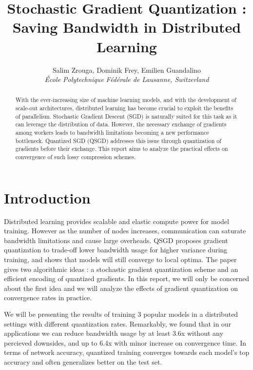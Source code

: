\documentclass[10pt,conference,compsocconf]{IEEEtran}
\begin{document}
\title{Stochastic Gradient Quantization : \\ Saving Bandwidth in Distributed Learning}

\author{
  Salim Zrouga, Dominik Frey, Emilien Guandalino\\
  \textit{École Polytechnique Fédérale de Lausanne, Switzerland}
}

\maketitle

\begin{abstract}

	With the ever-increasing size of machine learning models, and with the development of scale-out architectures, distributed learning has become crucial to exploit the benefits of parallelism. Stochastic Gradient Descent (SGD) is naturally suited for this task as it can leverage the distribution of data. However, the necessary exchange of gradients among workers leads to bandwidth limitations becoming a new performance bottleneck. Quantized SGD (QSGD) addresses this issue through quantization of gradients before their exchange. This report aims to analyze the practical effects on convergence of such lossy compression schemes.
\end{abstract}

\section{Introduction}

Distributed learning provides scalable and elastic compute power for model training. 
However as the number of nodes increases, communication can saturate bandwidth limitations and cause large overheads.
QSGD \cite{quant} proposes gradient quantization to trade-off lower bandwidth usage for higher variance during training, and shows that models will still converge to local optima. The paper gives two algorithmic ideas : a stochastic gradient quantization scheme and an efficient encoding of quantized gradients. In this report, we will only be concerned about the first idea and we will analyze the effects of gradient quantization on convergence rates in practice.

We will be presenting the results of training 3 popular models in a distributed settings with different quantization rates. Remarkably, we found that in our applications we can reduce bandwidth usage by at least 3.6x without any percieved downsides, and up to 6.4x with minor increase on convergence time. In terms of network accuracy, quantized training converges towards each model's top accuracy and often generalizes better on the test set.
\end{document}
